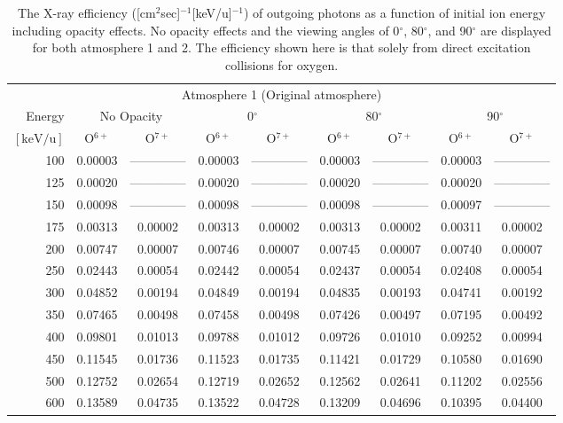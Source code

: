 \begin{table}[ht]
    \centering
    \caption{The X-ray efficiency ([cm$^2$sec]$^{-1}$[keV/u]$^{-1}$) of outgoing photons as a function of initial ion energy including opacity effects. No opacity effects and the viewing angles of 0$^\circ$, 80$^\circ$, and 90$^\circ$ are displayed for both atmosphere 1 and 2. The efficiency shown here is that solely from direct excitation collisions for oxygen.}
    \begin{tabular}{r|c|c|c|c|c|c|c|c}
    \multicolumn{9}{c}{Atmosphere 1 (Original atmosphere)} \\ \cline{2-9}
    Energy & \multicolumn{2}{c|}{No Opacity} & \multicolumn{2}{c|}{0$^\circ$} & \multicolumn{2}{c|}{80$^\circ$} & \multicolumn{2}{c}{90$^\circ$} \\ \cline{2-9}
    $\mathrm{[keV/u]}$ & O$^{6+}$ & O$^{7+}$ & O$^{6+}$ & O$^{7+}$ & O$^{6+}$ & O$^{7+}$ & O$^{6+}$ & O$^{7+}$ \\ \cline{1-9}
      100 & 0.00003 & -------------- & 0.00003 & -------------- & 0.00003 & -------------- & 0.00003 & -------------- \\
      125 & 0.00020 & -------------- & 0.00020 & -------------- & 0.00020 & -------------- & 0.00020 & -------------- \\
      150 & 0.00098 & -------------- & 0.00098 & -------------- & 0.00098 & -------------- & 0.00097 & -------------- \\
      175 & 0.00313 & 0.00002 & 0.00313 & 0.00002 & 0.00313 & 0.00002 & 0.00311 & 0.00002 \\
      200 & 0.00747 & 0.00007 & 0.00746 & 0.00007 & 0.00745 & 0.00007 & 0.00740 & 0.00007 \\
      250 & 0.02443 & 0.00054 & 0.02442 & 0.00054 & 0.02437 & 0.00054 & 0.02408 & 0.00054 \\
      300 & 0.04852 & 0.00194 & 0.04849 & 0.00194 & 0.04835 & 0.00193 & 0.04741 & 0.00192 \\
      350 & 0.07465 & 0.00498 & 0.07458 & 0.00498 & 0.07426 & 0.00497 & 0.07195 & 0.00492 \\
      400 & 0.09801 & 0.01013 & 0.09788 & 0.01012 & 0.09726 & 0.01010 & 0.09252 & 0.00994 \\
      450 & 0.11545 & 0.01736 & 0.11523 & 0.01735 & 0.11421 & 0.01729 & 0.10580 & 0.01690 \\
      500 & 0.12752 & 0.02654 & 0.12719 & 0.02652 & 0.12562 & 0.02641 & 0.11202 & 0.02556 \\
      600 & 0.13589 & 0.04735 & 0.13522 & 0.04728 & 0.13209 & 0.04696 & 0.10395 & 0.04400 \\

\end{tabular}
\end{table}
